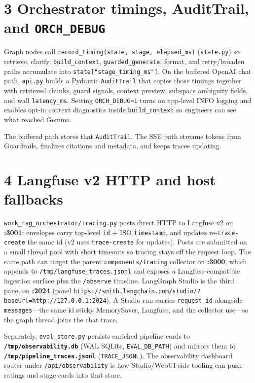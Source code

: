 \section{\texorpdfstring{3 Orchestrator timings, AuditTrail, and \texttt{ORCH\_DEBUG}}{3 Orchestrator timings, AuditTrail, and ORCH\_DEBUG}}\label{orchestrator-timings-audittrail-and-orch_debug}

Graph nodes call \texttt{record\_timing(state,\ stage,\ elapsed\_ms)} (\texttt{state.py}) so retrieve, clarify, \texttt{build\_context}, \texttt{guarded\_generate}, format, and retry/broaden paths accumulate into \texttt{state{[}"stage\_timing\_ms"{]}}. On the buffered OpenAI chat path, \texttt{api.py} builds a Pydantic \texttt{AuditTrail} that copies those timings together with retrieved chunks, guard signals, context preview, subspace ambiguity fields, and wall \texttt{latency\_ms}. Setting \texttt{ORCH\_DEBUG=1} turns on app-level INFO logging and enables opt-in context diagnostics inside \texttt{build\_context} so engineers can see what reached Gemma.

The buffered path stores that \texttt{AuditTrail}. The SSE path streams tokens from Guardrails, finalizes citations and metadata, and keeps traces updating.

\section{4 Langfuse v2 HTTP and host fallbacks}\label{langfuse-v2-http-and-host-fallbacks}

\texttt{work\_rag\_orchestrator/tracing.py} posts direct HTTP to Langfuse v2 on \textbf{:3001}: envelopes carry top-level \texttt{id} + ISO \texttt{timestamp}, and updates re-\texttt{trace-create} the same id (v2 uses \texttt{trace-create} for updates). Posts are submitted on a small thread pool with short timeouts so tracing stays off the request loop. The same path can target the parent \texttt{components/tracing} collector on \textbf{:3000}, which appends to \texttt{/tmp/langfuse\_traces.jsonl} and exposes a Langfuse-compatible ingestion surface plus the \texttt{/observe} timeline. LangGraph Studio is the third pane, on \textbf{:2024} (panel \texttt{https://smith.langchain.com/studio/?baseUrl=http://127.0.0.1:2024}). A Studio run carries \texttt{request\_id} alongside \texttt{messages}---the same id sticky MemorySaver, Langfuse, and the collector use---so the graph thread joins the chat trace.

Separately, \texttt{eval\_store.py} persists enriched pipeline cards to \textbf{\texttt{/tmp/observability.db}} (WAL SQLite, \texttt{EVAL\_DB\_PATH}) and mirrors them to \textbf{\texttt{/tmp/pipeline\_traces.jsonl}} (\texttt{TRACE\_JSONL}). The observability dashboard router under \texttt{/api/observability} is how Studio/WebUI-side tooling can push ratings and stage cards into that store.


